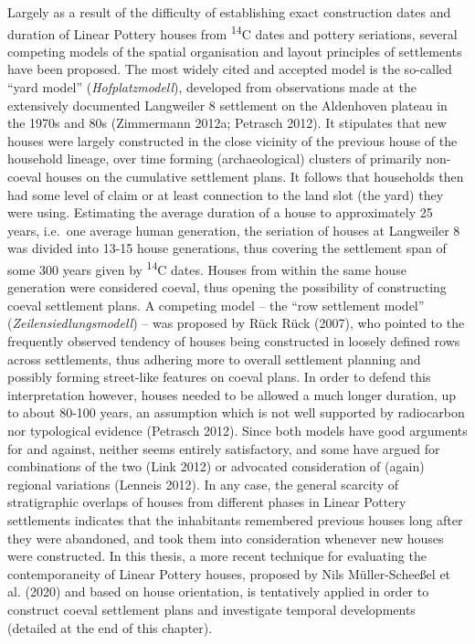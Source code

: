 \documentclass[
  12pt,
  a4paper, twoside]{book}
\begin{document}
Largely as a result of the difficulty of establishing exact construction dates and duration of Linear Pottery houses from \textsuperscript{14}C dates and pottery seriations, several competing models of the spatial organisation and layout principles of settlements have been proposed. The most widely cited and accepted model is the so-called ``yard model'' (\emph{Hofplatzmodell}), developed from observations made at the extensively documented Langweiler 8 settlement on the Aldenhoven plateau in the 1970s and 80s (Zimmermann 2012a; Petrasch 2012). It stipulates that new houses were largely constructed in the close vicinity of the previous house of the household lineage, over time forming (archaeological) clusters of primarily non-coeval houses on the cumulative settlement plans. It follows that households then had some level of claim or at least connection to the land slot (the yard) they were using. Estimating the average duration of a house to approximately 25 years, i.e.~one average human generation, the seriation of houses at Langweiler 8 was divided into 13-15 house generations, thus covering the settlement span of some 300 years given by \textsuperscript{14}C dates. Houses from within the same house generation were considered coeval, thus opening the possibility of constructing coeval settlement plans. A competing model -- the ``row settlement model'' (\emph{Zeilensiedlungsmodell}) -- was proposed by Rück Rück (2007), who pointed to the frequently observed tendency of houses being constructed in loosely defined rows across settlements, thus adhering more to overall settlement planning and possibly forming street-like features on coeval plans. In order to defend this interpretation however, houses needed to be allowed a much longer duration, up to about 80-100 years, an assumption which is not well supported by radiocarbon nor typological evidence (Petrasch 2012). Since both models have good arguments for and against, neither seems entirely satisfactory, and some have argued for combinations of the two (Link 2012) or advocated consideration of (again) regional variations (Lenneis 2012). In any case, the general scarcity of stratigraphic overlaps of houses from different phases in Linear Pottery settlements indicates that the inhabitants remembered previous houses long after they were abandoned, and took them into consideration whenever new houses were constructed. In this thesis, a more recent technique for evaluating the contemporaneity of Linear Pottery houses, proposed by Nils Müller-Scheeßel et al. (2020) and based on house orientation, is tentatively applied in order to construct coeval settlement plans and investigate temporal developments (detailed at the end of this chapter).
\end{document}
